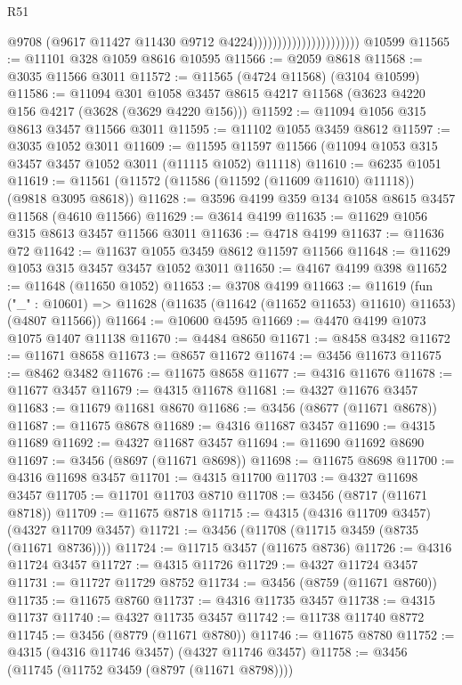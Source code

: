 \begin{lexlean}{R51}
\begin{coremodule}
                                              @9708
                                              (@9617 @11427 @11430 @9712 @4224))))))))))))))))))))))
    @10599
@11565 := @11101 @328 @1059 @8616 @10595
@11566 := @2059 @8618
@11568 := @3035 @11566 @3011
@11572 := @11565 (@4724 @11568) (@3104 @10599)
@11586 := @11094
    @301
    @1058
    @3457
    @8615
    @4217
    @11568
    (@3623 @4220 @156 @4217 (@3628 (@3629 @4220 @156)))
@11592 := @11094 @1056 @315 @8613 @3457 @11566 @3011
@11595 := @11102 @1055 @3459 @8612
@11597 := @3035 @1052 @3011
@11609 := @11595 @11597 @11566 (@11094 @1053 @315 @3457 @3457 @1052 @3011 (@11115 @1052) @11118)
@11610 := @6235 @1051
@11619 := @11561 (@11572 (@11586 (@11592 (@11609 @11610) @11118)) (@9818 @3095 @8618))
@11628 := @3596 @4199 @359 @134 @1058 @8615 @3457 @11568 (@4610 @11566)
@11629 := @3614 @4199
@11635 := @11629 @1056 @315 @8613 @3457 @11566 @3011
@11636 := @4718 @4199
@11637 := @11636 @72
@11642 := @11637 @1055 @3459 @8612 @11597 @11566
@11648 := @11629 @1053 @315 @3457 @3457 @1052 @3011
@11650 := @4167 @4199 @398
@11652 := @11648 (@11650 @1052)
@11653 := @3708 @4199
@11663 := @11619
    (fun ("_" : @10601) => @11628 (@11635 (@11642 (@11652 @11653) @11610) @11653) (@4807 @11566))
@11664 := @10600 @4595
@11669 := @4470 @4199 @1073 @1075 @1407 @11138
@11670 := @4484 @8650
@11671 := @8458 @3482
@11672 := @11671 @8658
@11673 := @8657 @11672
@11674 := @3456 @11673
@11675 := @8462 @3482
@11676 := @11675 @8658
@11677 := @4316 @11676
@11678 := @11677 @3457
@11679 := @4315 @11678
@11681 := @4327 @11676 @3457
@11683 := @11679 @11681 @8670
@11686 := @3456 (@8677 (@11671 @8678))
@11687 := @11675 @8678
@11689 := @4316 @11687 @3457
@11690 := @4315 @11689
@11692 := @4327 @11687 @3457
@11694 := @11690 @11692 @8690
@11697 := @3456 (@8697 (@11671 @8698))
@11698 := @11675 @8698
@11700 := @4316 @11698 @3457
@11701 := @4315 @11700
@11703 := @4327 @11698 @3457
@11705 := @11701 @11703 @8710
@11708 := @3456 (@8717 (@11671 @8718))
@11709 := @11675 @8718
@11715 := @4315 (@4316 @11709 @3457) (@4327 @11709 @3457)
@11721 := @3456 (@11708 (@11715 @3459 (@8735 (@11671 @8736))))
@11724 := @11715 @3457 (@11675 @8736)
@11726 := @4316 @11724 @3457
@11727 := @4315 @11726
@11729 := @4327 @11724 @3457
@11731 := @11727 @11729 @8752
@11734 := @3456 (@8759 (@11671 @8760))
@11735 := @11675 @8760
@11737 := @4316 @11735 @3457
@11738 := @4315 @11737
@11740 := @4327 @11735 @3457
@11742 := @11738 @11740 @8772
@11745 := @3456 (@8779 (@11671 @8780))
@11746 := @11675 @8780
@11752 := @4315 (@4316 @11746 @3457) (@4327 @11746 @3457)
@11758 := @3456 (@11745 (@11752 @3459 (@8797 (@11671 @8798))))

\end{coremodule}
\end{lexlean}
